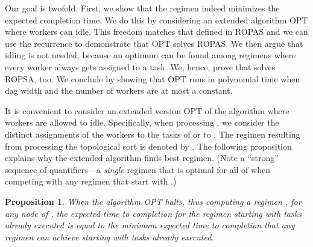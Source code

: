 \documentclass[letterpaper,11pt]{article}
\newtheorem{proposition}[theorem]{Proposition}
\newcommand{\remove}[1]{}
\begin{document}
Our goal is twofold. First, we show that the regimen  indeed minimizes the expected completion time. We do this by considering an extended algorithm OPT where workers can idle. This freedom matches that defined in ROPAS and we can use the recurrence to demonstrate that OPT solves ROPAS. We then argue that idling is not needed, because an optimum can be found among regimens where every worker always gets assigned to a task. We, hence, prove that  solves ROPSA, too. We conclude by showing that OPT runs in polynomial time when dag width and the number of workers are at most a constant.


It is convenient to consider an extended version OPT of the algorithm where workers are allowed to idle. Specifically, when processing , we consider the  distinct assignments of the  workers to the tasks of  or to . The regimen resulting from processing the topological sort is denoted by . The following proposition explains why the extended algorithm finds best regimen. (Note a ``strong'' sequence of quantifiers---a {\em single} regimen that is optimal for all  of  when competing with any regimen that start with .)

\begin{proposition}
\label{p.dp}
When the algorithm OPT halts, thus computing a regimen , for any node  of , the expected time to completion for the regimen starting with tasks  already executed is equal to the minimum expected time to completion  that any regimen can achieve starting with tasks  already executed.
\end{proposition}

\remove{**********************
\begin{proof}[sketch]
We show that as we process the topological sort, we maintain an invariant that for all sets  subsequent to  in the sort, regimen  achieves  when starting with . When processing a set , an optimal regimen starting with  will have, by Theorem~\ref{t.recursive}, expectation expressed as expectations for sets subsequent in the sort. By the invariant they must be at least the corresponding expectations for . Hence  can be selected optimally.
\end{proof}
**********************}
\end{document}
